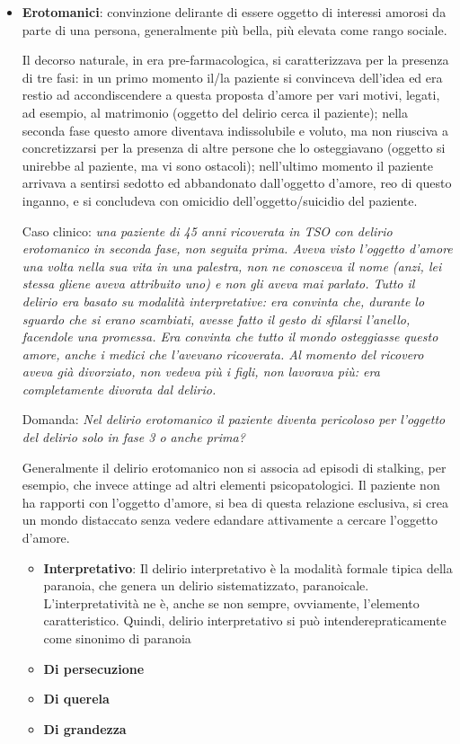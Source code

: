 \begin{itemize}
\item
  \textbf{Erotomanici}: convinzione delirante di essere oggetto di
  interessi amorosi da parte di una persona, generalmente più bella, più
  elevata come rango sociale.

Il decorso naturale, in era pre-farmacologica, si caratterizzava per la
presenza di tre fasi: in un primo momento il/la paziente si convinceva
dell'idea ed era restio ad accondiscendere a questa proposta d'amore per
vari motivi, legati, ad esempio, al matrimonio (oggetto del delirio
cerca il paziente); nella seconda fase questo amore diventava
indissolubile e voluto, ma non riusciva a concretizzarsi per la presenza
di altre persone che lo osteggiavano (oggetto si unirebbe al paziente,
ma vi sono ostacoli); nell'ultimo momento il paziente arrivava a
sentirsi sedotto ed abbandonato dall'oggetto d'amore, reo di questo
inganno, e si concludeva con omicidio dell'oggetto/suicidio del
paziente.

Caso clinico: \emph{una paziente di 45 anni ricoverata in TSO con
delirio erotomanico in seconda fase, non seguita prima. Aveva visto
l'oggetto d'amore una volta nella sua vita in una palestra, non ne
conosceva il nome (anzi, lei stessa gliene aveva attribuito uno) e non
gli aveva mai parlato. Tutto il delirio era basato su modalità
interpretative: era convinta che, durante lo sguardo che si erano
scambiati, avesse fatto il gesto di sfilarsi l'anello, facendole una
promessa. Era convinta che tutto il mondo osteggiasse questo amore,
anche i medici che l'avevano ricoverata. Al momento del ricovero aveva
già divorziato, non vedeva più i figli, non lavorava più: era
completamente divorata dal delirio.}

Domanda: \emph{Nel delirio erotomanico il paziente diventa pericoloso
per l'oggetto del delirio solo in fase 3 o anche prima?}

Generalmente il delirio erotomanico non si associa ad episodi di
stalking, per esempio, che invece attinge ad altri elementi
psicopatologici. Il paziente non ha rapporti con l'oggetto d'amore, si
bea di questa relazione esclusiva, si crea un mondo distaccato senza
vedere edandare attivamente a cercare l'oggetto d'amore.

\begin{itemize}
\item
  \textbf{Interpretativo}: Il delirio interpretativo è la modalità
  formale tipica della paranoia, che genera un delirio sistematizzato,
  paranoicale. L'interpretatività ne è, anche se non sempre, ovviamente,
  l'elemento caratteristico. Quindi, delirio interpretativo si può
  intenderepraticamente come sinonimo di paranoia
\item
  \textbf{Di persecuzione}
\item
  \textbf{Di querela}
\item
  \textbf{Di grandezza}
\end{itemize}
\end{itemize}

